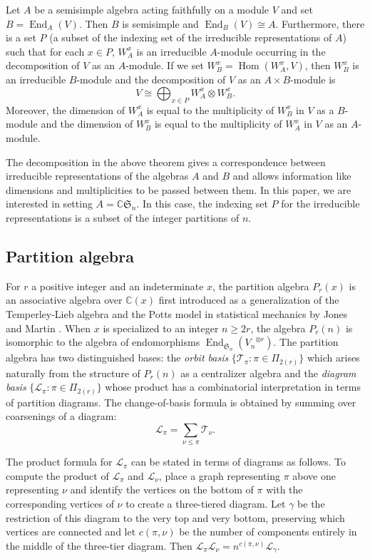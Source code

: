 \documentclass[ALCO,Unicode,published]{cedram}
\newcommand{\C}{\mathbb{C}}
\newcommand{\TT}{\mathcal{T}}
\newcommand{\LL}{\mathcal{L}}
\newcommand{\SG}{\mathfrak{S}}
\newcommand{\defn}[1]{\textcolor{defncolor}{\emph{#1}}}
\DeclareMathOperator{\End}{End}
\DeclareMathOperator{\Hom}{Hom}
\begin{document}
\begin{theorem} Let $A$ be a semisimple algebra acting faithfully on a module $V$ and set $B=\End_A(V)$. Then $B$ is semisimple and $\End_B(V)\cong A$. Furthermore, there is a set $P$ (a subset of the indexing set of the irreducible representations of $A$) such that for each $x\in P$, $W_A^x$ is an irreducible $A$-module occurring in the decomposition of $V$ as an $A$-module. If we set $W_B^x=\Hom(W_A^x, V)$, then $W_B^x$ is an irreducible $B$-module and the decomposition of $V$ as an $A\times B$-module is \[V\cong\bigoplus_{x\in P}W_A^x\otimes W_B^x.\] Moreover, the dimension of $W_A^x$ is equal to the multiplicity of $W_B^x$ in $V$ as a $B$-module and the dimension of $W_B^x$ is equal to the multiplicity of $W_A^x$ in $V$ as an $A$-module.
\end{theorem}

The decomposition in the above theorem gives a correspondence between irreducible representations of the algebras $A$ and $B$ and allows information like dimensions and multiplicities to be passed between them. In this paper, we are interested in setting $A=\C\SG_n$. In this case, the indexing set $P$ for the irreducible representations is a subset of the integer partitions of $n$.

\subsection{Partition algebra}\label{sec:partitionalgebra}

For $r$ a positive integer and an indeterminate $x$, the partition algebra $P_r(x)$ is an associative algebra over $\C(x)$ first introduced as a generalization of the Temperley-Lieb algebra and the Potts model in statistical mechanics by Jones \cite{jones1993potts} and Martin \cite{martin, Martin1994AlgebrasIH}. When $x$ is specialized to an integer $n\geq 2r$, the algebra $P_r(n)$ is isomorphic to the algebra of endomorphisms $\End_{\SG_n}({V_n}^{\otimes r})$. The partition algebra has two distinguished bases: the \defn{orbit basis} $\{\TT_\pi:\pi\in\Pi_{2(r)}\}$ which arises naturally from the structure of $P_r(n)$ as a centralizer algebra and the \defn{diagram basis} $\{\LL_\pi:\pi\in\Pi_{2(r)}\}$ whose product has a combinatorial interpretation in terms of partition diagrams. The change-of-basis formula is obtained by summing over coarsenings of a diagram: \[\LL_\pi=\sum_{\nu\leq\pi}\TT_\nu.\]

The product formula for $\LL_\pi$ can be stated in terms of diagrams as follows. To compute the product of $\LL_\pi$ and $\LL_\nu$, place a graph representing $\pi$ above one representing $\nu$ and identify the vertices on the bottom of $\pi$ with the corresponding vertices of $\nu$ to create a three-tiered diagram. Let $\gamma$ be the restriction of this diagram to the very top and very bottom, preserving which vertices are connected and let $c(\pi,\nu)$ be the number of components entirely in the middle of the three-tier diagram. Then $\LL_\pi\LL_\nu=n^{c(\pi,\nu)}\LL_\gamma$.
\end{document}
